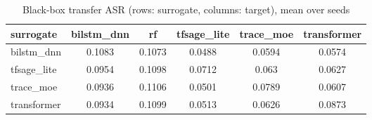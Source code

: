 \begin{table}[htbp]
\centering
\caption{Black-box transfer ASR (rows: surrogate, columns: target), mean over seeds}
\label{tab:transfer_attack_matrix}
\begin{tabular}{lccccc}
\toprule
surrogate & bilstm\_dnn & rf & tfsage\_lite & trace\_moe & transformer \\
\midrule
bilstm\_dnn & 0.1083 & 0.1073 & 0.0488 & 0.0594 & 0.0574 \\
tfsage\_lite & 0.0954 & 0.1098 & 0.0712 & 0.063 & 0.0627 \\
trace\_moe & 0.0936 & 0.1106 & 0.0501 & 0.0789 & 0.0607 \\
transformer & 0.0934 & 0.1099 & 0.0513 & 0.0626 & 0.0873 \\
\bottomrule
\end{tabular}
\end{table}